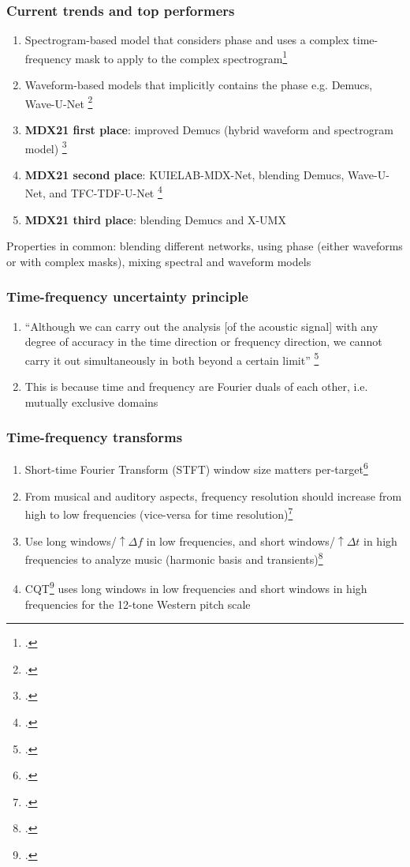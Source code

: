 \documentclass[usenames,dvipsnames]{beamer}
\begin{document}
\begin{frame}
	\frametitle{Current trends and top performers}
	\begin{enumerate}
		\item
			Spectrogram-based model that considers phase and uses a complex time-frequency mask to apply to the complex spectrogram\footcite{kong2021decoupling}
		\item
			Waveform-based models that implicitly contains the phase e.g. Demucs, Wave-U-Net \footcite{demucs, waveunet, endtoend}
		\item
			\textbf{MDX21 first place}: improved Demucs (hybrid waveform and spectrogram model) \footcite{demucsplus}
		\item
			\textbf{MDX21 second place}: KUIELAB-MDX-Net, blending Demucs, Wave-U-Net, and TFC-TDF-U-Net \footcite{choi_2020}
		\item
			\textbf{MDX21 third place}: blending Demucs and X-UMX
	\end{enumerate}
	Properties in common: blending different networks, using phase (either waveforms or with complex masks), mixing spectral and waveform models
\end{frame}

\begin{frame}
	\frametitle{Time-frequency uncertainty principle}
	\begin{enumerate}
		\item
			``Although we can carry out the analysis [of the acoustic signal] with any degree of accuracy in the time direction or frequency direction, we cannot carry it out simultaneously in both beyond a certain limit'' \footcite[432]{gabor1946}
		\item
			This is because time and frequency are Fourier duals of each other, i.e. mutually exclusive domains

	\end{enumerate}
\end{frame}

\begin{frame}
	\frametitle{Time-frequency transforms}
	\begin{enumerate}
	\item
		Short-time Fourier Transform (STFT) window size matters per-target\footcite{tftradeoff1, tftradeoff2}
	\item
		From musical and auditory aspects, frequency resolution should increase from high to low frequencies (vice-versa for time resolution)\footcite{cqtransient}
	\item
		Use long windows/$\uparrow \Delta f$ in low frequencies, and short windows/$\uparrow \Delta t$ in high frequencies to analyze music (harmonic basis and transients)\footcite{doerflerphd}
	\item
		CQT\footcite{jbrown, klapuricqt} uses long windows in low frequencies and short windows in high frequencies for the 12-tone Western pitch scale
	\end{enumerate}
\end{frame}
\end{document}
